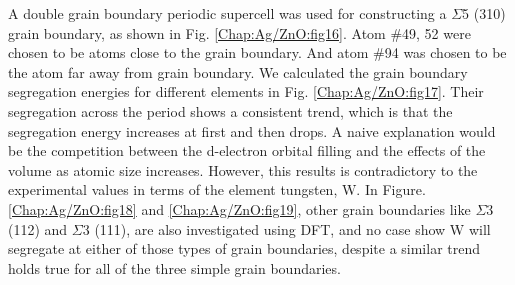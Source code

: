 A double grain boundary periodic supercell was used for constructing a $\Sigma$5 (310) grain boundary, as shown in Fig. \ref{Chap:Ag/ZnO:fig16}. Atom \#49, 52 were chosen to be atoms close to the grain boundary. And atom \#94 was chosen to be the atom far away from grain boundary. We calculated the grain boundary segregation energies for different elements in Fig. \ref{Chap:Ag/ZnO:fig17}. Their segregation across the period shows a consistent trend, which is that the segregation energy increases at first and then drops. A naive explanation would be the competition between the d-electron orbital filling and the effects of the volume as atomic size increases. However, this results is contradictory to the experimental values in terms of the element tungsten, W. \cite{chookajorn2012design,jiao2018nanocrystalline} In Figure. \ref{Chap:Ag/ZnO:fig18} and \ref{Chap:Ag/ZnO:fig19}, other grain boundaries like $\Sigma$3 (112) and $\Sigma$3 (111), are also investigated using \ac{DFT}, and no case show W will segregate at either of those types of grain boundaries, despite a similar trend holds true for all of the three simple grain boundaries.

